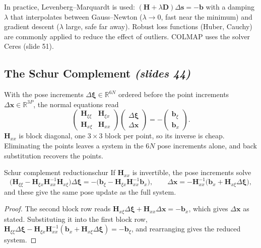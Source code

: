 \documentclass[11pt,a4paper]{article}
\newcommand{\slr}[1]{\texorpdfstring{\emph{(slides #1)}}{(slides #1)}}
\newcommand{\R}{\mathbb{R}}
\begin{document}
\begin{beyond}
In practice, Levenberg--Marquardt is used: $(\bm H+\lambda\bm D)\Delta\bm s=-\bm b$ with a damping $\lambda$ that interpolates between Gauss--Newton ($\lambda\to0$, fast near the minimum) and gradient descent ($\lambda$ large, safe far away). Robust loss functions (Huber, Cauchy) are commonly applied to reduce the effect of outliers. COLMAP uses the solver Ceres (slide 51).
\end{beyond}

\subsection{The Schur Complement \slr{44}}
With the pose increments $\Delta\bm\xi\in\R^{6N}$ ordered before the point increments $\Delta\bm x\in\R^{3P}$, the normal equations read
\[
\begin{pmatrix}\bm H_{\xi\xi}&\bm H_{\xi x}\\\bm H_{x\xi}&\bm H_{xx}\end{pmatrix}\begin{pmatrix}\Delta\bm\xi\\\Delta\bm x\end{pmatrix}=-\begin{pmatrix}\bm b_\xi\\\bm b_x\end{pmatrix}.
\]
$\bm H_{xx}$ is block diagonal, one $3\times3$ block per point, so its inverse is cheap. Eliminating the points leaves a system in the $6N$ pose increments alone, and back substitution recovers the points.

\begin{theorem}{Schur complement reduction}{schur}
If $\bm H_{xx}$ is invertible, the pose increments solve
\[
\bigl(\bm H_{\xi\xi}-\bm H_{\xi x}\bm H_{xx}^{-1}\bm H_{x\xi}\bigr)\Delta\bm\xi=-\bigl(\bm b_\xi-\bm H_{\xi x}\bm H_{xx}^{-1}\bm b_x\bigr),
\qquad
\Delta\bm x=-\bm H_{xx}^{-1}\bigl(\bm b_x+\bm H_{x\xi}\Delta\bm\xi\bigr),
\]
and these give the same pose update as the full system.
\end{theorem}
\begin{proof}
The second block row reads $\bm H_{x\xi}\Delta\bm\xi+\bm H_{xx}\Delta\bm x=-\bm b_x$, which gives $\Delta\bm x$ as stated. Substituting it into the first block row,
$\bm H_{\xi\xi}\Delta\bm\xi-\bm H_{\xi x}\bm H_{xx}^{-1}(\bm b_x+\bm H_{x\xi}\Delta\bm\xi)=-\bm b_\xi$, and rearranging gives the reduced system.
\end{proof}
\end{document}
